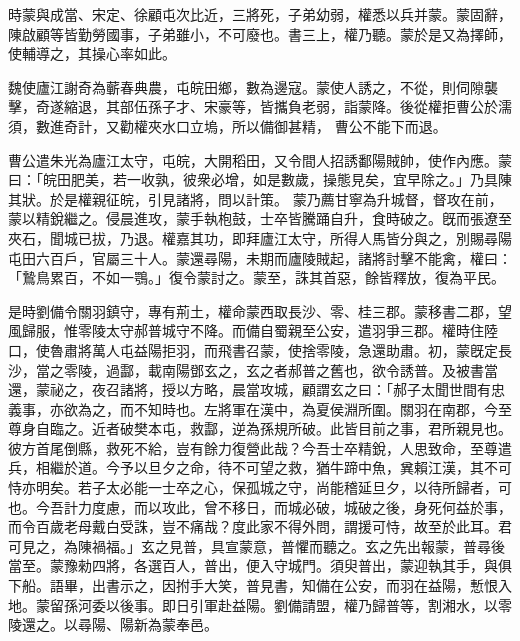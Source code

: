 \begin{pinyinscope}
 
 
 
 時蒙與成當、宋定、徐顧屯次比近，三將死，子弟幼弱，權悉以兵并蒙。蒙固辭，陳啟顧等皆勤勞國事，子弟雖小，不可廢也。書三上，權乃聽。蒙於是又為擇師，使輔導之，其操心率如此。
 
 
魏使廬江謝奇為蘄春典農，屯皖田鄉，數為邊寇。蒙使人誘之，不從，則伺隙襲擊，奇遂縮退，其部伍孫子才、宋豪等，皆攜負老弱，詣蒙降。後從權拒曹公於濡須，數進奇計，又勸權夾水口立塢，所以備御甚精，
 曹公不能下而退。
 
 
曹公遣朱光為廬江太守，屯皖，大開稻田，又令間人招誘鄱陽賊帥，使作內應。蒙曰：「皖田肥美，若一收孰，彼衆必增，如是數歲，操態見矣，宜早除之。」乃具陳其狀。於是權親征皖，引見諸將，問以計策。
 蒙乃薦甘寧為升城督，督攻在前，蒙以精銳繼之。侵晨進攻，蒙手執枹鼓，士卒皆騰踊自升，食時破之。旣而張遼至夾石，聞城已拔，乃退。權嘉其功，即拜廬江太守，所得人馬皆分與之，別賜尋陽屯田六百戶，官屬三十人。蒙還尋陽，未期而廬陵賊起，諸將討擊不能禽，權曰：「鷙鳥累百，不如一鶚。」復令蒙討之。蒙至，誅其首惡，餘皆釋放，復為平民。
 
 
 
 
 是時劉備令關羽鎮守，專有荊土，權命蒙西取長沙、零、桂三郡。蒙移書二郡，望風歸服，惟零陵太守郝普城守不降。而備自蜀親至公安，遣羽爭三郡。權時住陸口，使魯肅將萬人屯益陽拒羽，而飛書召蒙，使捨零陵，急還助肅。初，蒙旣定長沙，當之零陵，過酃，載南陽鄧玄之，玄之者郝普之舊也，欲令誘普。及被書當還，蒙祕之，夜召諸將，授以方略，晨當攻城，顧謂玄之曰：「郝子太聞世間有忠義事，亦欲為之，而不知時也。左將軍在漢中，為夏侯淵所圍。關羽在南郡，今至尊身自臨之。近者破樊本屯，救酃，逆為孫規所破。此皆目前之事，君所親見也。彼方首尾倒縣，救死不給，豈有餘力復營此哉？今吾士卒精銳，人思致命，至尊遣兵，相繼於道。今予以旦夕之命，待不可望之救，猶牛蹄中魚，兾賴江漢，其不可恃亦明矣。若子太必能一士卒之心，保孤城之守，尚能稽延旦夕，以待所歸者，可也。今吾計力度慮，而以攻此，曾不移日，而城必破，城破之後，身死何益於事，而令百歲老母戴白受誅，豈不痛哉？度此家不得外問，謂援可恃，故至於此耳。君可見之，為陳禍福。」玄之見普，具宣蒙意，普懼而聽之。玄之先出報蒙，普尋後當至。蒙豫勑四將，各選百人，普出，便入守城門。須臾普出，蒙迎執其手，與俱下船。語畢，出書示之，因拊手大笑，普見書，知備在公安，而羽在益陽，慙恨入地。蒙留孫河委以後事。即日引軍赴益陽。劉備請盟，權乃歸普等，割湘水，以零陵還之。以尋陽、陽新為蒙奉邑。
 

\end{pinyinscope}
